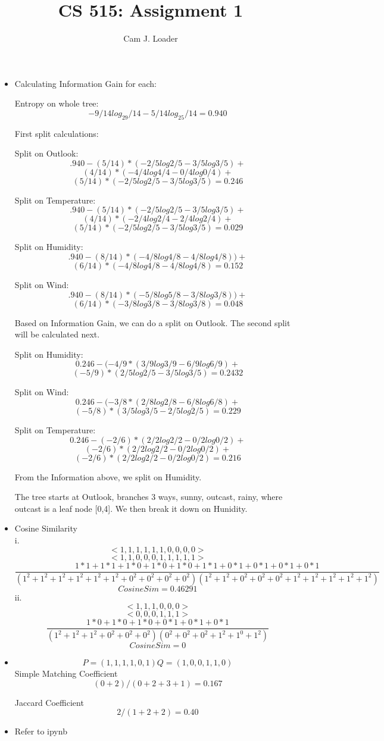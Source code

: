\documentclass[12pt]{article}
\title{CS 515: Assignment 1}
\author{Cam J. Loader}
\begin{document}
\maketitle

\begin{itemize}
\item Calculating Information Gain for each: 

Entropy on whole tree: $$ -9/14log_29/14 - 5/14log_25/14 = 0.940$$

First split calculations:

Split on Outlook: $$.940 - (5/14) * (-2/5log2/5 - 3/5log3/5) + $$ 
                         $$(4/14) * (-4/4log4/4 - 0/4log0/4) + $$
                         $$(5/14) * (-2/5log2/5 - 3/5log3/5) = 0.246$$

Split on Temperature:  $$.940 - (5/14) * (-2/5log2/5 - 3/5log3/5) +$$ 
                              $$(4/14) * (-2/4log2/4 - 2/4log2/4) + $$
                              $$(5/14) * (-2/5log2/5 - 3/5log3/5) = 0.029 $$

Split on Humidity:  $$.940 -(8/14) * (-4/8log4/8 - 4/8log4/8)) +$$ 
                          $$(6/14) * (-4/8log4/8 - 4/8log4/8) = 0.152 $$

Split on Wind: $$.940 -(8/14) * (-5/8log5/8 - 3/8log3/8)) +$$ 
                     $$(6/14) * (-3/8log3/8 - 3/8log3/8) = 0.048 $$


Based on Information Gain, we can do a split on Outlook. The second split will be calculated next.

Split on Humidity: $$ 0.246 - (-4/9 * (3/9log3/9 - 6/9log6/9) + $$
                              $$(-5/9) * (2/5log2/5 - 3/5log3/5) = 0.2432 $$ 

Split on Wind:   $$ 0.246 - (-3/8 * (2/8log2/8 - 6/8log6/8) + $$
                            $$(-5/8) * (3/5log3/5 - 2/5log2/5) = 0.229 $$ 

Split on Temperature:  $$ 0.246 - (-2/6) * (2/2log2/2 - 0/2log0/2) + $$
                                 $$ (-2/6) * (2/2log2/2 - 0/2log0/2) + $$
                                  $$(-2/6) * (2/2log2/2 - 0/2log0/2) = 0.216 $$ 

From the Information above, we split on Humidity.

The tree starts at Outlook, branches 3 ways, sunny, outcast, rainy, where outcast is a leaf node [0,4]. We then break it down on Hunidity.

\item Cosine Similarity \\
i. $$<1,1,1,1,1,1,0,0,0,0>$$ $$<1,1,0,0,0,1,1,1,1,1>$$ $$\frac{1*1+1*1+1*0+1*0+1*0+1*1+0*1+0*1+0*1+0*1}{(1^2+1^2+1^2+1^2+1^2+1^2+0^2+0^2+0^2+0^2)(1^2+1^2+0^2+0^2+0^2+1^2+1^2+1^2+1^2+1^2)}$$ $$CosineSim = 0.46291$$
ii. $$<1,1,1,0,0,0>$$ $$<0,0,0,1,1,1>$$ $$\frac{1*0+1*0+1*0+0*1+0*1+0*1}{(1^2+1^2+1^2+0^2+0^2+0^2)(0^2+0^2+0^2+1^2+1^0+1^2)}$$ $$CosineSim = 0$$
\item $$  P = (1, 1, 1, 1, 0, 1) 
          Q = (1, 0, 0, 1, 1, 0)$$
Simple Matching Coefficient
$$ (0 + 2)/(0+2+3+1) = 0.167 $$

Jaccard Coefficient
$$ 2/(1+2+2)=0.40$$
\item Refer to ipynb
\end{itemize}
\end{document}
